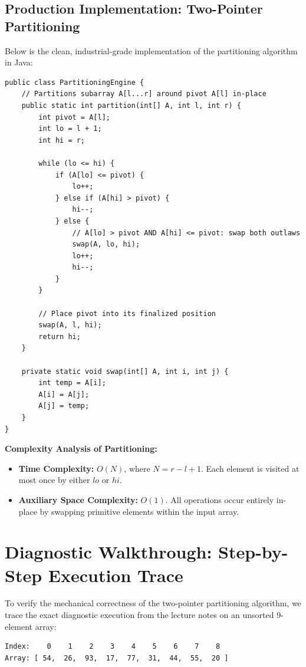 \documentclass[10pt,journal,compsoc,onecolumn]{IEEEtran}
\begin{document}
\subsection{Production Implementation: Two-Pointer Partitioning}

Below is the clean, industrial-grade implementation of the partitioning algorithm in Java:

\begin{verbatim}
public class PartitioningEngine {
    // Partitions subarray A[l...r] around pivot A[l] in-place
    public static int partition(int[] A, int l, int r) {
        int pivot = A[l];
        int lo = l + 1;
        int hi = r;

        while (lo <= hi) {
            if (A[lo] <= pivot) {
                lo++;
            } else if (A[hi] > pivot) {
                hi--;
            } else {
                // A[lo] > pivot AND A[hi] <= pivot: swap both outlaws
                swap(A, lo, hi);
                lo++;
                hi--;
            }
        }

        // Place pivot into its finalized position
        swap(A, l, hi);
        return hi;
    }

    private static void swap(int[] A, int i, int j) {
        int temp = A[i];
        A[i] = A[j];
        A[j] = temp;
    }
}
\end{verbatim}

\textbf{Complexity Analysis of Partitioning:}
\begin{itemize}
    \item \textbf{Time Complexity:} $O(N)$, where $N = r - l + 1$. Each element is visited at most once by either $lo$ or $hi$.
    \item \textbf{Auxiliary Space Complexity:} $O(1)$. All operations occur entirely in-place by swapping primitive elements within the input array.
\end{itemize}

\section{Diagnostic Walkthrough: Step-by-Step Execution Trace}
\label{sec:trace}

To verify the mechanical correctness of the two-pointer partitioning algorithm, we trace the exact diagnostic execution from the lecture notes on an unsorted 9-element array:
\begin{verbatim}
Index:    0    1    2    3    4    5    6    7    8
Array: [ 54,  26,  93,  17,  77,  31,  44,  55,  20 ]
\end{verbatim}
\end{document}
